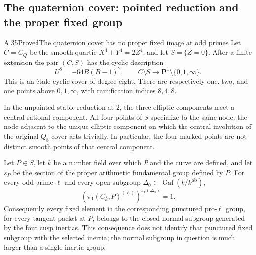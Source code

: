 \subsection{The quaternion cover: pointed reduction and the proper fixed group}

\begin{statement}{A.35}{Proved}{The quaternion cover has no proper fixed image at odd primes}
Let \(C=C_Q\) be the smooth quartic \(X^4+Y^4=2Z^4\), and
let \(S=\{Z=0\}\). After a finite extension the pair \((C,S)\)
has the cyclic description
\[
             U^8=-64B(B-1)^2,\qquad
             C\setminus S\longrightarrow
                    \mathbf P^1\setminus\{0,1,\infty\}.
                                                        \tag{A.35.1}
\]
This is an \'etale cyclic cover of degree eight. There are respectively
one, two, and one points above \(0,1,\infty\), with ramification
indices \(8,4,8\).

In the unpointed stable reduction at \(2\), the three elliptic
components meet a central rational component. All four points of
\(S\) specialize to the same node: the node adjacent to the unique
elliptic component on which the central involution of the original
\(Q_8\)-cover acts trivially. In particular, the four marked points
are not distinct smooth points of that central component.

Let \(P\in S\), let \(k\) be a number field over which \(P\) and
the curve are defined, and let \(\bar s_P\) be the section of the
proper arithmetic fundamental group defined by \(P\). For every
odd prime \(\ell\) and every open subgroup
\(\Delta_0\subset\operatorname{Gal}(\bar k/k^{\mathrm{ab}})\),
\[
 \left(\pi_1(C_{\bar k},P)^{(\ell)}\right)^{
                                  \bar s_P(\Delta_0)}=1.
                                                        \tag{A.35.2}
\]
Consequently every fixed element in the corresponding punctured
pro-\(\ell\) group, for every tangent packet at \(P\), belongs to
the closed normal subgroup generated by the four cusp inertias.
This consequence does not identify that punctured fixed subgroup
with the selected inertia; the normal subgroup in question is
much larger than a single inertia group.
\end{statement}

